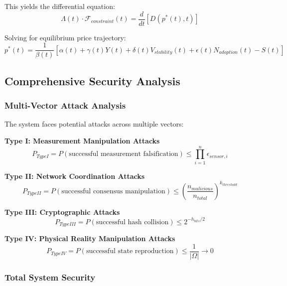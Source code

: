 \documentclass[12pt,a4paper]{article}
\begin{document}
This yields the differential equation:
\begin{equation}
\Lambda(t) \cdot \mathcal{F}_{constraint}(t) = \frac{d}{dt}[D(p^*(t),t)]
\end{equation}

Solving for equilibrium price trajectory:
\begin{equation}
p^*(t) = \frac{1}{\beta(t)}\left[\alpha(t) + \gamma(t)Y(t) + \delta(t)V_{stability}(t) + \epsilon(t)N_{adoption}(t) - S(t)\right]
\end{equation}

\subsection{Comprehensive Security Analysis}

\subsubsection{Multi-Vector Attack Analysis}

The system faces potential attacks across multiple vectors:

\textbf{Type I: Measurement Manipulation Attacks}
\begin{equation}
P_{Type I} = P(\text{successful measurement falsification}) \leq \prod_{i=1}^{n} \epsilon_{sensor,i}
\end{equation}

\textbf{Type II: Network Coordination Attacks}
\begin{equation}
P_{Type II} = P(\text{successful consensus manipulation}) \leq \left(\frac{n_{malicious}}{n_{total}}\right)^{k_{threshold}}
\end{equation}

\textbf{Type III: Cryptographic Attacks}
\begin{equation}
P_{Type III} = P(\text{successful hash collision}) \leq 2^{-h_{bits}/2}
\end{equation}

\textbf{Type IV: Physical Reality Manipulation Attacks}
\begin{equation}
P_{Type IV} = P(\text{successful state reproduction}) \leq \frac{1}{|\Omega|} \to 0
\end{equation}

\subsubsection{Total System Security}
\end{document}
